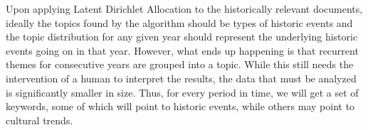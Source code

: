 Upon applying Latent Dirichlet Allocation to the historically relevant documents, ideally the topics found by the algorithm should be types of historic events and the topic distribution for any given year should represent the underlying historic events going on in that year. However, what ends up happening is that recurrent themes for consecutive years are grouped into a topic. While this still needs the intervention of a human to interpret the results, the data that must be analyzed is significantly smaller in size. Thus, for every period in time, we will get a set of keywords, some of which will point to historic events, while others may point to cultural trends.
